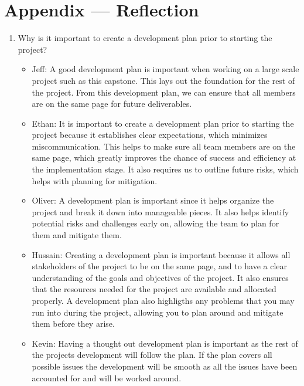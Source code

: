 \documentclass{article}
\begin{document}
\newpage{}

\section*{Appendix --- Reflection}




\begin{enumerate}
    \item Why is it important to create a development plan prior to starting the
    project?
	\begin{itemize}
		\item Jeff: A good development plan is important when working 
    on a large scale project such as this capstone. 
    This lays out the foundation for the rest of the project.
    From this development plan, we can ensure that all
    members are on the same page for future deliverables.
    \item Ethan: It is important to create a development plan prior to starting
      the project because it establishes clear expectations, which minimizes
      miscommunication. This helps to make sure all team members are on the
      same page, which greatly improves the chance of success and efficiency at
      the implementation stage. It also requires us to outline future risks,
      which helps with planning for mitigation.
		\item Oliver: A development plan is important since it helps organize 
    the project and break it down into manageable pieces. It also helps 
    identify potential risks and challenges early on, allowing the team 
    to plan for them and mitigate them. 
		\item Hussain: Creating a development plan is important because it 
    allows all stakeholders of the project to be on the same page, 
    and to have a clear understanding of the goals and objectives 
    of the project. It also ensures that the resources needed for 
    the project are available and allocated properly. 
    A development plan also highligths any problems that 
    you may run into during the project, allowing you to plan 
    around and mitigate them before they arise.
		\item Kevin: Having a thought out development plan is important as the 
        rest of the projects development will follow the plan. If the plan 
        covers all possible issues the development will be smooth as all the 
        issues have been accounted for and will be worked around. 

\end{itemize}
\end{enumerate}
\end{document}
